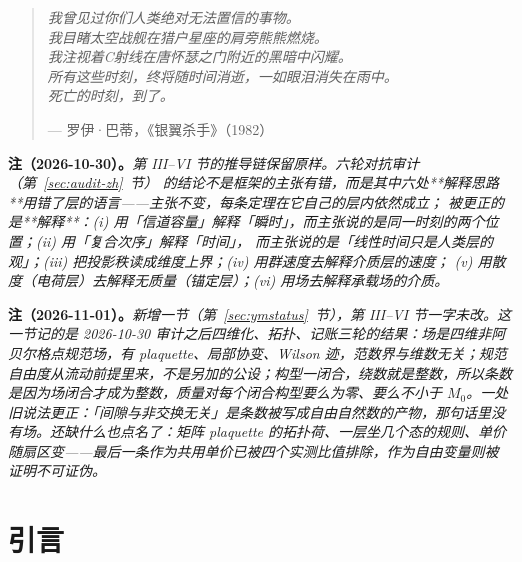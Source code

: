 \documentclass[aps,prd,preprint,superscriptaddress,amsmath,amssymb]{revtex4-2}
\begin{document}
\maketitle

\begin{quote}
\itshape
我曾见过你们人类绝对无法置信的事物。\\
我目睹太空战舰在猎户星座的肩旁熊熊燃烧。\\
我注视着C射线在唐怀瑟之门附近的黑暗中闪耀。\\
所有这些时刻，终将随时间消逝，一如眼泪消失在雨中。\\
死亡的时刻，到了。
\par
\vspace{0.4em}
--- 罗伊·巴蒂，《银翼杀手》（1982）
\end{quote}

\noindent\textbf{注（2026-10-30）。}\emph{第 III--VI 节的推导链保留原样。六轮对抗审计（第~\ref{sec:audit-zh}~节）
的结论不是框架的主张有错，而是其中六处**解释思路**用错了层的语言——主张不变，每条定理在它自己的层内依然成立；
被更正的是**解释**：(i) 用「信道容量」解释「瞬时」，而主张说的是同一时刻的两个位置；(ii) 用「复合次序」解释「时间」，
而主张说的是「线性时间只是人类层的观」；(iii) 把投影秩读成维度上界；(iv) 用群速度去解释介质层的速度；
(v) 用散度（电荷层）去解释无质量（锚定层）；(vi) 用场去解释承载场的介质。}

\noindent\textbf{注（2026-11-01）。}\emph{新增一节（第~\ref{sec:ymstatus}~节），第 III--VI 节一字未改。这一节记的是 2026-10-30 审计之后四维化、拓扑、记账三轮的结果：场是四维非阿贝尔格点规范场，有 plaquette、局部协变、Wilson 迹，范数界与维数无关；规范自由度从流动前提里来，不是另加的公设；构型一闭合，绕数就是整数，所以条数是因为场闭合才成为整数，质量对每个闭合构型要么为零、要么不小于 $M_0$。一处旧说法更正：「间隙与非交换无关」是条数被写成自由自然数的产物，那句话里没有场。还缺什么也点名了：矩阵 plaquette 的拓扑荷、一层坐几个态的规则、单价随扇区变——最后一条作为共用单价已被四个实测比值排除，作为自由变量则被证明不可证伪。}

\section{引言}
\label{sec:intro}
\end{document}

